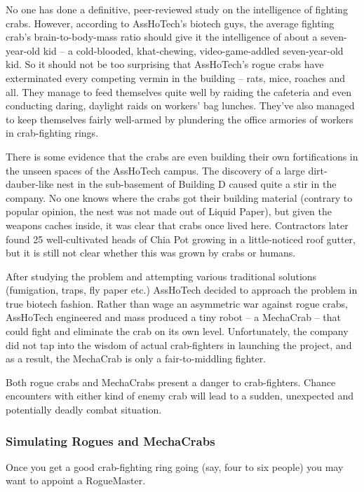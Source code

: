 \documentclass[a4paper,10pt]{article}
\begin{document}
No one has done a definitive, peer-reviewed study on the intelligence of fighting crabs. However, according to AssHoTech's biotech guys, the average fighting crab's brain-to-body-mass ratio should give it the intelligence of about a seven-year-old kid -- a cold-blooded, khat-chewing, video-game-addled seven-year-old kid. So it should not be too surprising that AssHoTech's rogue crabs have exterminated every competing vermin in the building -- rats, mice, roaches and all. They manage to feed themselves quite well by raiding the cafeteria and even conducting daring, daylight raids on workers' bag lunches. They've also managed to keep themselves fairly well-armed by plundering the office armories of workers in crab-fighting rings.

There is some evidence that the crabs are even building their own fortifications in the unseen spaces of the AssHoTech campus. The discovery of a large dirt-dauber-like nest in the sub-basement of Building D caused quite a stir in the company. No one knows where the crabs got their building material (contrary to popular opinion, the nest was not made out of Liquid Paper), but given the weapons caches inside, it was clear that crabs once lived here. Contractors later found 25 well-cultivated heads of Chia Pot growing in a little-noticed roof gutter, but it is still not clear whether this was grown by crabs or humans.

After studying the problem and attempting various traditional solutions (fumigation, traps, fly paper etc.) AssHoTech decided to approach the problem in true biotech fashion. Rather than wage an asymmetric war against rogue crabs, AssHoTech engineered and mass produced a tiny robot -- a MechaCrab -- that could fight and eliminate the crab on its own level. Unfortunately, the company did not tap into the wisdom of actual crab-fighters in launching the project, and as a result, the MechaCrab is only a fair-to-middling fighter.

Both rogue crabs and MechaCrabs present a danger to crab-fighters. Chance encounters with either kind of enemy crab will lead to a sudden, unexpected and potentially deadly combat situation.

\subsubsection*{Simulating Rogues and MechaCrabs}
\label{sec:SimulatingRoguesandMechaCrabs}

Once you get a good crab-fighting ring going (say, four to six people) you may want to appoint a RogueMaster.
\end{document}
